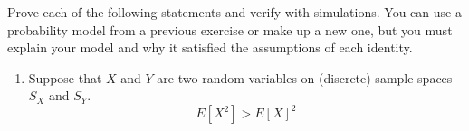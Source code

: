 \begin{exercise}
Prove each of the following statements and verify with simulations. You can use a probability model from a previous exercise or make up a new one, but you must explain your model and why it satisfied the assumptions of each identity. 
\begin{enumerate}[label=(\alpha*)]
\item Suppose that $X$ and $Y$ are two random variables on (discrete) sample spaces $S_X$ and $S_Y$. 
\begin{equation}
E[X^2]>E[X]^2
\end{equation}
\end{enumerate} 
\end{exercise}





%

%















